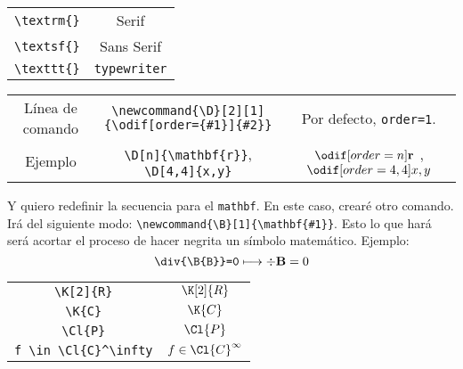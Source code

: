 \begin{center}
\begin{tabular}{|c|c|}\hline 
     \verb|\textrm{}|&\textrm{Serif}  \\
     \verb|\textsf{}|&\textsf{Sans Serif}\\
     \verb|\texttt{}|&\texttt{typewriter} \\ \hline
\end{tabular}
\end{center}
\begin{center}
\begin{tabular}{|c|c|c|} \hline
   Línea de comando& \verb|\newcommand{\D}[2][1]{\odif[order={#1}]{#2}}| & Por defecto, \verb|order=1|. \\
     Ejemplo& \verb|\D[n]{\mathbf{r}}|, \verb|\D[4,4]{x,y}| & $\D[n]{\mathbf{r}}$ , $\D[4,4]{x,y}$ \\ \hline 
\end{tabular}
\end{center}
Y quiero redefinir la secuencia para el \verb|mathbf|. En este caso, crearé otro comando. Irá del siguiente modo: \verb|\newcommand{\B}[1]{\mathbf{#1}}|. Esto lo que hará será acortar el proceso de hacer negrita un símbolo matemático. Ejemplo:
$$
\verb|\div{\B{B}}=0| \longmapsto \div{\B{B}=0}
$$
\begin{center}
\begin{tabular}{|c|c|} \hline
     \verb|\K[2]{R}|&$\K[2]{R}$  \\
    \verb|\K{C}| & $\K{C}$  \\ 
    \verb|\Cl{P}| & $\Cl{P}$ \\
    \verb|f \in \Cl{C}^\infty| & $f \in \Cl{C}^\infty$\\\hline
\end{tabular}
\end{center}